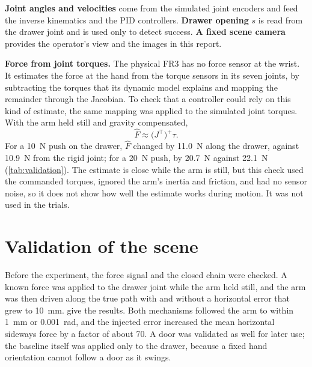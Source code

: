 \documentclass[11pt,a4paper]{article}
\begin{document}
\textbf{Joint angles and velocities} come from the simulated joint encoders and feed the inverse
kinematics and the PID controllers. \textbf{Drawer opening} $s$ is read from the drawer joint and
is used only to detect success. \textbf{A fixed scene camera} provides the operator's view and the
images in this report.

\textbf{Force from joint torques.} The physical FR3 has no force sensor at the wrist. It estimates
the force at the hand from the torque sensors in its seven joints, by subtracting the torques
that its dynamic model explains and mapping the remainder through the Jacobian. To check that a
controller could rely on this kind of estimate, the same mapping was applied to the simulated
joint torques. With the arm held still and gravity compensated,
\begin{equation}\label{eq:estimate}
  \hat F \approx \bigl(J^{\top}\bigr)^{+} \tau .
\end{equation}
For a 10~N push on the drawer, $\hat F$ changed by 11.0~N along the drawer, against 10.9~N from
the rigid joint; for a 20~N push, by 20.7~N against 22.1~N (\cref{tab:validation}). The estimate is
close while the arm is still, but this check used the commanded torques, ignored the arm's
inertia and friction, and had no sensor noise, so it does not show how well the estimate works
during motion. It was not used in the trials.

\section{Validation of the scene}\label{sec:validation}

Before the experiment, the force signal and the closed chain were checked. A known force was
applied to the drawer joint while the arm held still, and the arm was then driven along the true
path with and without a horizontal error that grew to 10~mm. 
give the results. Both mechanisms followed the arm to within 1~mm or 0.001~rad, and the injected
error increased the mean horizontal sideways force by a factor of about 70. A door was validated
as well for later use; the baseline itself was applied only to the drawer, because a fixed hand
orientation cannot follow a door as it swings.
\end{document}
